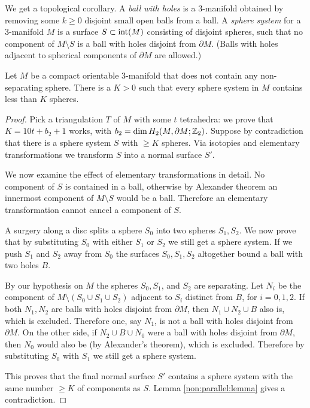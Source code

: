 We get a topological corollary. A \emph{ball with holes} is a 3-manifold obtained by removing some $k\geqslant 0$ disjoint small open balls from a ball.
A \emph{sphere system} for a 3-manifold $M$ is a surface $S\subset {\rm int}(M)$ consisting of disjoint spheres, such that no component of $M\setminus S$ is a ball with holes disjoint from $\partial M$. (Balls with holes adjacent to spherical components of $\partial M$ are allowed.) 

\begin{cor} \label{K:cor}
Let $M$ be a compact orientable 3-manifold that does not contain any non-separating sphere. There is a $K>0$ such that every sphere system in $M$ contains less than $K$ spheres.
\end{cor}
\begin{proof}
Pick a triangulation $T$ of $M$ with some $t$ tetrahedra: we prove that $K=10t + b_2+1$ works, with $b_2 = \dim H_2(M,\partial M;\mathbb{Z}_2)$. Suppose by contradiction that there is a sphere system $S$ with $\geqslant K$ spheres. Via isotopies and elementary transformations we transform $S$ into a normal surface $S'$.

We now examine the effect of elementary transformations in detail. No component of $S$ is contained in a ball, otherwise by Alexander theorem an innermost component of $M\setminus S$ would be a ball. Therefore an elementary transformation cannot cancel a component of $S$. 

A surgery along a disc splits a sphere $S_0$ into two spheres $S_1, S_2$. 
We now prove that by substituting $S_0$ with either $S_1$ or $S_2$ we still get a sphere system. If we push $S_1$ and $S_2$ away from $S_0$ the surfaces $S_0, S_1, S_2$ altogether bound a ball with two holes $B$. 

By our hypothesis on $M$ the spheres $S_0, S_1$, and $S_2$ are separating. Let $N_i$ be the component of $M\setminus (S_0\cup S_1\cup S_2)$ adjacent to $S_i$ distinct from $B$, for $i=0,1,2$. If both $N_1, N_2$ are balls with holes disjoint from $\partial M$, then $N_1\cup N_2 \cup B$ also is, which is excluded. Therefore one, say $N_1$, is not a ball with holes disjoint from $\partial M$. On the other side, if $N_2 \cup B \cup N_0$ were a ball with holes disjoint from $\partial M$, then $N_0$ would also be (by Alexander's theorem), which is excluded. Therefore by substituting $S_0$ with $S_1$ we still get a sphere system.

This proves that the final normal surface $S'$ contains a sphere system with the same number $\geqslant K$ of components as $S$. Lemma \ref{non:parallel:lemma} gives a contradiction.
\end{proof}

